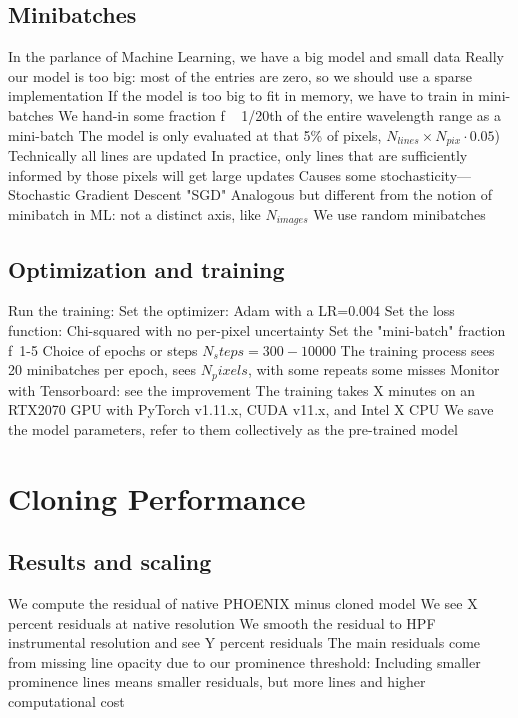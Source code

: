 \documentclass[modern]{aastex631}
\begin{document}
\subsection{Minibatches}
\begin{outline}
  \1 In the parlance of Machine Learning, we have a big model and small data
  \1 Really our model is too big: most of the entries are zero, so we should use a sparse implementation
  \1 If the model is too big to fit in memory, we have to train in mini-batches
  \1 We hand-in some fraction f ~ 1/20th of the entire wavelength range as a mini-batch
  \1 The model is only evaluated at that 5\% of pixels,  $N_{lines} \times N_{pix} \cdot 0.05$)
  \1 Technically all lines are updated
  \1 In practice, only lines that are sufficiently informed by those pixels will get large updates
  \1 Causes some stochasticity--- Stochastic Gradient Descent "SGD"
  \1 Analogous but different from the notion of minibatch in ML: not a distinct axis, like $N_{images}$
  \1 We use random minibatches
\end{outline}

\subsection{Optimization and training}
\begin{outline}
  \1 Run the training:
  \1 Set the optimizer: Adam with a LR=0.004
  \1 Set the loss function: Chi-squared with no per-pixel uncertainty
  \1 Set the "mini-batch" fraction f~1-5%
  \1 Choice of epochs or steps $N_steps = 300-10000$
  \1 The training process sees 20 minibatches per epoch, sees $N_pixels$, with some repeats some misses
  \1 Monitor with Tensorboard: see the improvement
  \1 The training takes X minutes on an RTX2070 GPU with PyTorch v1.11.x, CUDA v11.x, and Intel X CPU
  \1 We save the model parameters, refer to them collectively as the pre-trained model
\end{outline}


\section{Cloning Performance}

\subsection{Results and scaling}

\begin{outline}
  \1 We compute the residual of native PHOENIX minus cloned model
  \1 We see X percent residuals at native resolution
  \1 We smooth the residual to HPF instrumental resolution and see Y percent residuals
  \1 The main residuals come from missing line opacity due to our prominence threshold:
  \1 Including smaller prominence lines means smaller residuals, but more lines and higher computational cost
\end{outline}
\end{document}
